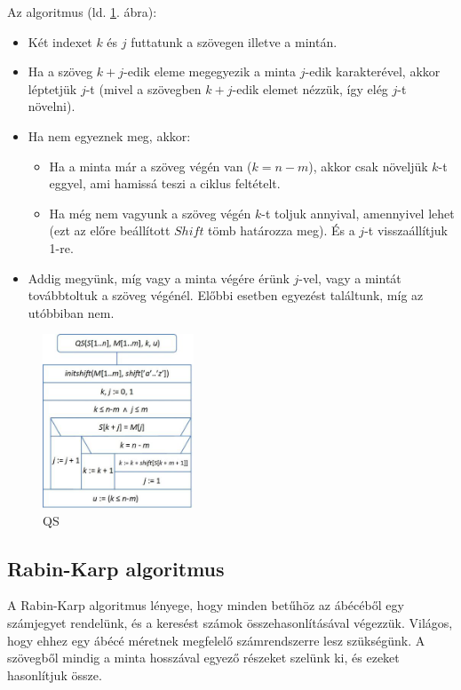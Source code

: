 \documentclass[margin=0px]{article}
\begin{document}
	\noindent Az algoritmus (ld. \ref{fig:BoyerMoore}. ábra):
    \begin{itemize}
        \item Két indexet $k$ és $j$ futtatunk a szövegen illetve a mintán.
        \item Ha a szöveg $k+j$-edik eleme megegyezik a minta $j$-edik karakterével, akkor léptetjük $j$-t (mivel a szövegben $k+j$-edik elemet nézzük, így elég $j$-t növelni).
        \item Ha nem egyeznek meg, akkor:
        \begin{itemize}
            \item Ha a minta már a szöveg végén van ($k=n-m$), akkor csak növeljük $k$-t eggyel, ami hamissá teszi a ciklus feltételt.
            \item Ha még nem vagyunk a szöveg végén $k$-t toljuk annyival, amennyivel lehet (ezt az előre beállított $Shift$ tömb határozza meg). És a $j$-t visszaállítjuk 1-re.
	   \end{itemize}
        \item Addig megyünk, míg vagy a minta végére érünk $j$-vel, vagy a mintát továbbtoltuk a szöveg végénél. Előbbi esetben egyezést találtunk, míg az utóbbiban nem.
			\end{itemize}
			
			\begin{figure}[H]
				\centering
				\includegraphics[width=0.4\textwidth]{img/QS_algo.png}
				\caption{QS}
				\label{fig:BoyerMoore}
			\end{figure}
		\subsection*{Rabin-Karp algoritmus}

    A Rabin-Karp algoritmus lényege, hogy minden betűhöz az ábécéből egy számjegyet rendelünk, és a keresést számok összehasonlításával végezzük. Világos, hogy ehhez egy ábécé méretnek megfelelő számrendszerre lesz szükségünk. A szövegből mindig a minta hosszával egyező részeket szelünk ki, és ezeket hasonlítjuk össze.\\
			
\end{document}
